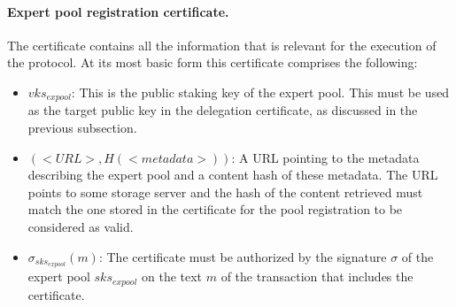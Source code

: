 \paragraph{Expert pool registration certificate.}
The certificate contains all the information that is relevant for the execution of the protocol. At its most basic form this certificate comprises the following:
\begin{itemize}
\item $vks_{expool}$: This is the public staking key of the expert pool. This must be used as the target public key in the delegation certificate, as discussed in the previous subsection.


\item $(<URL>, H(<metadata>))$: A URL pointing to the metadata describing the expert pool and a content hash of these metadata. The URL points to some storage server and the hash of the content retrieved must match the one stored in the certificate for the pool registration to be considered as valid.


\item $\sigma_{sks_{expool}}(m)$: The certificate must be authorized by the signature $\sigma$ of the expert pool $sks_{expool}$ on the text $m$ of the transaction that includes the certificate.

\end{itemize}

